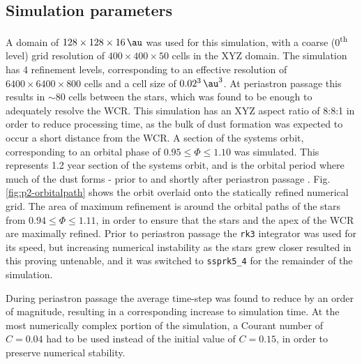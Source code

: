 \documentclass[fleqn,usenatbib]{mnras}
\newcommand{\ts}{\textsuperscript}
\begin{document}
\subsection{Simulation parameters}
\label{sec:p2-sysparameters}


A domain of $128 \times 128 \times 16 \, \si{\au}$ was used for this simulation, with a coarse (0\ts{th} level) grid resolution of $400\times 400 \times 50$ cells in the XYZ domain.
The simulation has 4 refinement levels, corresponding to an effective resolution of $6400 \times 6400 \times 800$ cells and a cell size of $0.02^3 \, \si{\au\cubed}$.
At periastron passage this results in $\sim 80$ cells between the stars, which was found to be enough to adequately resolve the WCR. 
This simulation has an XYZ aspect ratio of 8:8:1 in order to reduce processing time, as the bulk of dust formation was expected to occur a short distance from the WCR.
A section of the systems orbit, corresponding to an orbital phase of $0.95 \leq \Phi \leq 1.10$ was simulated.
This represents \num{1.2} year section of the systems orbit, and is the orbital period where much of the dust forms - prior to and shortly after periastron passage \citep{crowther_dust_2003}.
Fig. \ref{fig:p2-orbitalpath} shows the orbit overlaid onto the statically refined numerical grid.
The area of maximum refinement is around the orbital paths of the stars from $0.94 \leq \Phi \leq 1.11$, in order to ensure that the stars and the apex of the WCR are maximally refined.
Prior to periastron passage the \texttt{rk3} integrator was used for its speed, but increasing numerical instability as the stars grew closer resulted in this proving untenable, and it was switched to \texttt{ssprk5\_4} for the remainder of the simulation.

During periastron passage the average time-step was found to reduce by an order of magnitude, resulting in a corresponding increase to simulation time. %
At the most numerically complex portion of the simulation, a Courant number of $C = 0.04$ had to be used instead of the initial value of $C = 0.15$, in order to preserve numerical stability.
\end{document}
